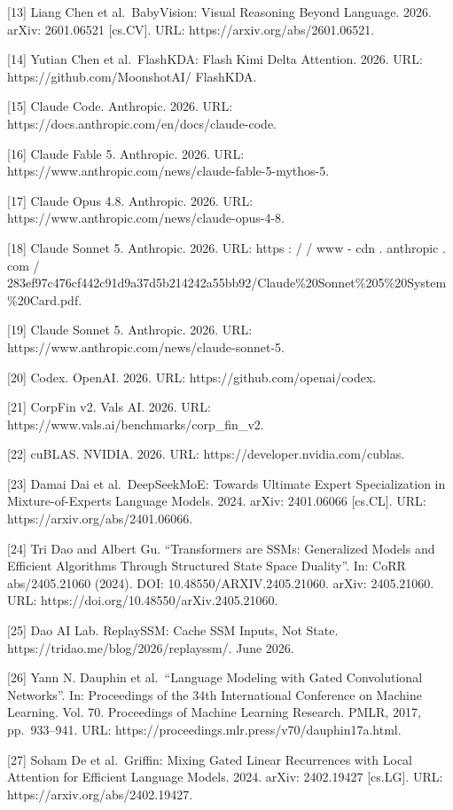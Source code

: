 {[}13{]} Liang Chen et al.~BabyVision: Visual Reasoning Beyond Language.
2026. arXiv: 2601.06521 {[}cs.CV{]}. URL:
https://arxiv.org/abs/2601.06521.

{[}14{]} Yutian Chen et al.~FlashKDA: Flash Kimi Delta Attention. 2026.
URL: https://github.com/MoonshotAI/ FlashKDA.

{[}15{]} Claude Code. Anthropic. 2026. URL:
https://docs.anthropic.com/en/docs/claude-code.

{[}16{]} Claude Fable 5. Anthropic. 2026. URL:
https://www.anthropic.com/news/claude-fable-5-mythos-5.

{[}17{]} Claude Opus 4.8. Anthropic. 2026. URL:
https://www.anthropic.com/news/claude-opus-4-8.

{[}18{]} Claude Sonnet 5. Anthropic. 2026. URL: https : / / www - cdn .
anthropic . com /
283ef97c476cf442c91d9a37d5b214242a55bb92/Claude\%20Sonnet\%205\%20System\%20Card.pdf.

{[}19{]} Claude Sonnet 5. Anthropic. 2026. URL:
https://www.anthropic.com/news/claude-sonnet-5.

{[}20{]} Codex. OpenAI. 2026. URL: https://github.com/openai/codex.

{[}21{]} CorpFin v2. Vals AI. 2026. URL:
https://www.vals.ai/benchmarks/corp\_fin\_v2.

{[}22{]} cuBLAS. NVIDIA. 2026. URL: https://developer.nvidia.com/cublas.

{[}23{]} Damai Dai et al.~DeepSeekMoE: Towards Ultimate Expert
Specialization in Mixture-of-Experts Language Models. 2024. arXiv:
2401.06066 {[}cs.CL{]}. URL: https://arxiv.org/abs/2401.06066.

{[}24{]} Tri Dao and Albert Gu. ``Transformers are SSMs: Generalized
Models and Efficient Algorithms Through Structured State Space
Duality''. In: CoRR abs/2405.21060 (2024). DOI:
10.48550/ARXIV.2405.21060. arXiv: 2405.21060. URL:
https://doi.org/10.48550/arXiv.2405.21060.

{[}25{]} Dao AI Lab. ReplaySSM: Cache SSM Inputs, Not State.
https://tridao.me/blog/2026/replayssm/. June 2026.

{[}26{]} Yann N. Dauphin et al.~``Language Modeling with Gated
Convolutional Networks''. In: Proceedings of the 34th International
Conference on Machine Learning. Vol. 70. Proceedings of Machine Learning
Research. PMLR, 2017, pp.~933--941. URL:
https://proceedings.mlr.press/v70/dauphin17a.html.

{[}27{]} Soham De et al.~Griffin: Mixing Gated Linear Recurrences with
Local Attention for Efficient Language Models. 2024. arXiv: 2402.19427
{[}cs.LG{]}. URL: https://arxiv.org/abs/2402.19427.

